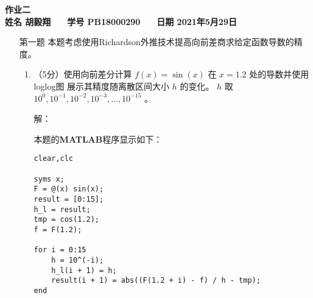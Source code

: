 \documentclass[12pt,a4paper,UTF8]{ctexart}
\theoremstyle{nonumberplain}
\begin{document}


\begin{center}
    \textbf{作业二}\\
    \textbf{姓名 胡毅翔 ~~ 学号 PB18000290 ~~ 日期 2021年5月29日}\\
\end{center}

\begin{center}
    \fbox{
        \begin{minipage}{40em}
            \vspace{5cm}
            \hspace{20cm}
        \end{minipage}}
\end{center}
\vspace{1cm}

\begin{enumerate}
    \item[第一题] 本题考虑使用Richardson外推技术提高向前差商求给定函数导数的精度。
          \begin{enumerate}\item  （5分）使用向前差分计算 $f(x)=\sin (x)$ 在 $x=1.2$ 处的导数并使用loglog图 展示其精度随离散区间大小 $h$ 的变化。 $h$ 取 $10^{0}, 10^{-1}, 10^{-2}, 10^{-3}, \ldots, 10^{-15}$ 。
                    \par 解：
                    \par 本题的\textbf{MATLAB}程序显示如下：
                    \begin{lstlisting}[frame=single]
clear,clc

syms x;
F = @(x) sin(x);
result = [0:15];
h_l = result;
tmp = cos(1.2);
f = F(1.2);

for i = 0:15
    h = 10^(-i);
    h_l(i + 1) = h;
    result(i + 1) = abs((F(1.2 + i) - f) / h - tmp);
end


\end{lstlisting}
\end{enumerate}
\end{enumerate}
\end{document}
